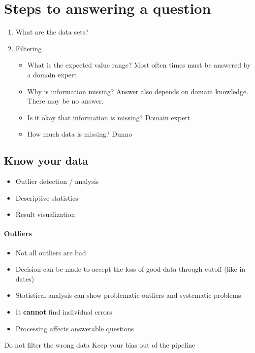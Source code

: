 \documentclass[10pt,a4paper]{scrreprt}
\begin{document}
\section{Steps to answering a question}
\begin{enumerate}
	\item What are the data sets?
	\item Filtering
	\begin{itemize}
		\item What is the expected value range?
		\subitem Most often times must be answered by a domain expert
		\item Why is information missing? 
		\subitem Answer also depends on domain knowledge. There may be no answer.
		\item Is it okay that information is missing?
		\subitem Domain expert
		\item How much data is missing?
		\subitem Dunno
	\end{itemize}
\end{enumerate}

\subsection{Know your data}
\begin{itemize}
	\item Outlier detection / analysis
	\item Descriptive statistics
	\item Result visualization
\end{itemize}

\paragraph{Outliers}
\begin{itemize}
	\item Not all outliers are bad
	\item Decision can be made to accept the loss of good data through cutoff (like in dates)
	\item Statistical analysis can show problematic outliers and systematic problems
	\item It \textbf{cannot} find individual errors
	\item Processing affects answerable questions
\end{itemize}
\large{Do not filter the wrong data}
\large{Keep your bias out of the pipeline}
\end{document}

